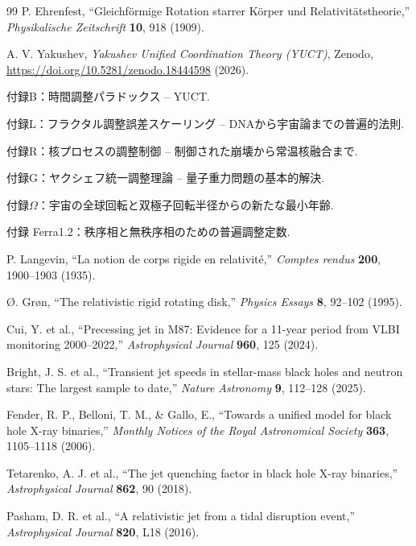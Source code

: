 \documentclass[12pt,a4paper]{article}
\begin{document}
	\begin{thebibliography}{99}
		P. Ehrenfest, ``Gleichf{\"o}rmige Rotation starrer K{\"o}rper und Relativit{\"a}tstheorie,'' \emph{Physikalische Zeitschrift} \textbf{10}, 918 (1909).
		
		A. V. Yakushev, \emph{Yakushev Unified Coordination Theory (YUCT)}, Zenodo, \url{https://doi.org/10.5281/zenodo.18444598} (2026).
		
		付録B：時間調整パラドックス -- YUCT.
		
		付録L：フラクタル調整誤差スケーリング -- DNAから宇宙論までの普遍的法則.
		
		付録R：核プロセスの調整制御 -- 制御された崩壊から常温核融合まで.
		
		付録G：ヤクシェフ統一調整理論 -- 量子重力問題の基本的解決.
		
		付録\(\Omega\)：宇宙の全球回転と双極子回転半径からの新たな最小年齢.
		
		付録 Ferra1.2：秩序相と無秩序相のための普遍調整定数.
		
		P. Langevin, ``La notion de corps rigide en relativit{\'e},'' \emph{Comptes rendus} \textbf{200}, 1900--1903 (1935).
		
		{\O}. Gr{\o}n, ``The relativistic rigid rotating disk,'' \emph{Physics Essays} \textbf{8}, 92--102 (1995).
		
		Cui, Y. et al., ``Precessing jet in M87: Evidence for a 11-year period from VLBI monitoring 2000–2022,'' \emph{Astrophysical Journal} \textbf{960}, 125 (2024).
		
		Bright, J. S. et al., ``Transient jet speeds in stellar-mass black holes and neutron stars: The largest sample to date,'' \emph{Nature Astronomy} \textbf{9}, 112–128 (2025).
		
		Fender, R. P., Belloni, T. M., \& Gallo, E., ``Towards a unified model for black hole X-ray binaries,'' \emph{Monthly Notices of the Royal Astronomical Society} \textbf{363}, 1105–1118 (2006).
		
		Tetarenko, A. J. et al., ``The jet quenching factor in black hole X-ray binaries,'' \emph{Astrophysical Journal} \textbf{862}, 90 (2018).
		
		Pasham, D. R. et al., ``A relativistic jet from a tidal disruption event,'' \emph{Astrophysical Journal} \textbf{820}, L18 (2016).
		

\end{thebibliography}
\end{document}

